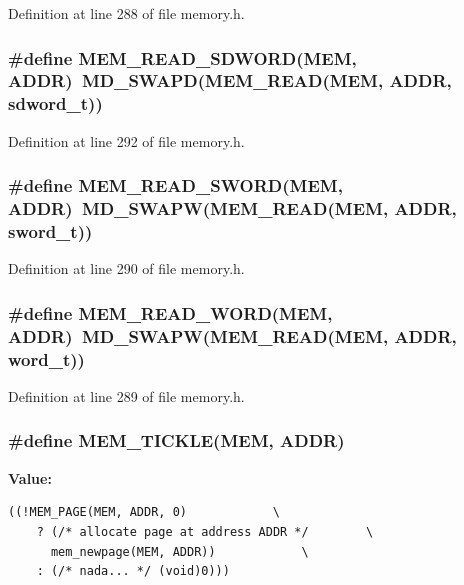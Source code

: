 Definition at line 288 of file memory.h.
\subsubsection[{MEM\_\-READ\_\-SDWORD}]{\setlength{\rightskip}{0pt plus 5cm}\#define MEM\_\-READ\_\-SDWORD(MEM, \/  ADDR)~MD\_\-SWAPD(MEM\_\-READ(MEM, ADDR, {\bf sdword\_\-t}))}\label{memory_8h_2990be943ca21b53b026d1ef6e0f2e90}




Definition at line 292 of file memory.h.
\subsubsection[{MEM\_\-READ\_\-SWORD}]{\setlength{\rightskip}{0pt plus 5cm}\#define MEM\_\-READ\_\-SWORD(MEM, \/  ADDR)~MD\_\-SWAPW(MEM\_\-READ(MEM, ADDR, {\bf sword\_\-t}))}\label{memory_8h_327b962e79529d0acb86308d0b0c7fd7}




Definition at line 290 of file memory.h.
\subsubsection[{MEM\_\-READ\_\-WORD}]{\setlength{\rightskip}{0pt plus 5cm}\#define MEM\_\-READ\_\-WORD(MEM, \/  ADDR)~MD\_\-SWAPW(MEM\_\-READ(MEM, ADDR, {\bf word\_\-t}))}\label{memory_8h_df7ec3c2beb389755a2368fcdb4d3c1d}




Definition at line 289 of file memory.h.
\subsubsection[{MEM\_\-TICKLE}]{\setlength{\rightskip}{0pt plus 5cm}\#define MEM\_\-TICKLE(MEM, \/  ADDR)}\label{memory_8h_192d28cbc253d5a267f35375ffb19fb9}


\textbf{Value:}

\begin{Code}\begin{verbatim}((!MEM_PAGE(MEM, ADDR, 0)            \
    ? (/* allocate page at address ADDR */        \
      mem_newpage(MEM, ADDR))            \
    : (/* nada... */ (void)0)))
\end{verbatim}
\end{Code}


